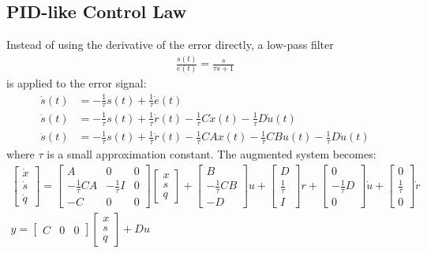 \subsection*{PID-like Control Law}
Instead of using the derivative of the error directly, a low-pass filter 
\begin{align*}
    \frac{s(t)}{e(t)}=\frac{s}{\tau s+1}
\end{align*}
is applied to the error signal:
\begin{align*}
\dot{s}(t)&=- \frac{1}{\tau} s(t)+ \frac{1}{\tau} \dot{e}(t)\\
\dot{s}(t)&=- \frac{1}{\tau} s(t)+ \frac{1}{\tau} \dot{r}(t)-\frac{1}{\tau}C\dot{x}(t)-\frac{1}{\tau}D\dot{u}(t)\\
\dot{s}(t)&=- \frac{1}{\tau} s(t)+ \frac{1}{\tau} \dot{r}(t)-\frac{1}{\tau}CAx(t)-\frac{1}{\tau}CBu(t)-\frac{1}{\tau}D\dot{u}(t)
\end{align*}
where $\tau$ is a small approximation constant. The augmented system becomes:
\begin{align*}
\begin{bmatrix}\dot{x}\\\dot{s}\\\dot{q}\end{bmatrix}=\begin{bmatrix}A & 0 & 0\\-\frac{1}{\tau}CA & -\frac{1}{\tau}I & 0\\-C & 0 & 0\end{bmatrix}\begin{bmatrix}x\\s\\q\end{bmatrix}+\begin{bmatrix}B\\-\frac{1}{\tau}CB\\-D\end{bmatrix}u+\begin{bmatrix}D\\\frac{1}{\tau}\\I\end{bmatrix}r+\begin{bmatrix}0\\-\frac{1}{\tau}D\\0\end{bmatrix}\dot{u}+\begin{bmatrix}0\\\frac{1}{\tau}\\0\end{bmatrix}\dot{r}\\
y=\begin{bmatrix}C & 0 & 0\end{bmatrix}\begin{bmatrix}x\\s\\q\end{bmatrix}+Du
\end{align*} 
